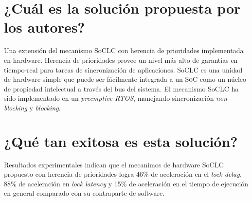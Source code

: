 \section{¿Cuál es la solución propuesta por los autores?}
Una extensión del mecanismo SoCLC con herencia de prioridades implementada en hardware. Herencia de prioridades provee un nivel más alto de garantías en tiempo-real para tareas de sincronización de aplicaciones. SoCLC es una unidad de hardware simple que puede ser fácilmente integrada a un \textsc{SoC} como un núcleo de propiedad intelectual a través del bus del sistema. El mecanismo SoCLC ha sido implementado en un \textit{preemptive RTOS}, manejando sincronización \textit{non-blocking} y \textit{blocking}.

\section{¿Qué tan exitosa es esta solución?} 
Resultados experimentales indican que el mecanimos de hardware SoCLC propuesto con herencia de prioridades logra 46\% de aceleración en el \textit{lock delay}, 88\% de aceleración en \textit{lock latency} y 15\% de aceleración en el tiempo de ejecución en general comparado con su contraparte de software.



